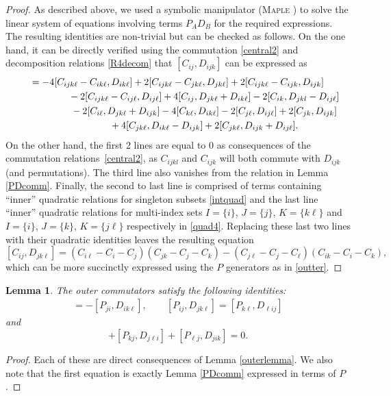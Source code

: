 \documentclass[10pt,a4paper]{amsart}
\numberwithin{equation}{section}
\newtheorem{Lemma}[Theorem]{Lemma}
\begin{document}
\begin{proof} As described above, we used a symbolic manipulator (\textsc{Maple} \cite{Maple}) to solve the linear system of equations involving terms $P_{A} D_B$ for the required expressions. The resulting identities are non-trivial but can be checked as follows. On the one hand, it can be directly verified using the commutation \eqref{central2} and decomposition relations \eqref{R4decom} that $[C_{ij}, D_{ijk}]$ can be expressed as
\begin{gather*}
[C_{ij},D_{jkl}]= - 4[C_{ijk\ell}-C_{ik\ell}, D_{ik\ell}]+2[C_{ijk\ell}-C_{jk\ell}, D_{jk\ell}]
+2[C_{ijk\ell}-C_{ijk}, D_{ijk}] \\
\hphantom{[C_{ij},D_{jkl}]=}{}- 2[C_{ijk\ell}-C_{ij\ell}, D_{ij\ell}]+4[C_{ij}, D_{jk\ell}+D_{ik\ell}]- 2[C_{ik},D_{jkl}-D_{ij\ell}]
\\
\hphantom{[C_{ij},D_{jkl}]=}{}- 2[C_{i\ell}, D_{jk\ell}+D_{ijk}]
-4 [C_{k\ell}, D_{ik\ell}]-2 [C_{j\ell}, D_{ij\ell}]
+2[C_{jk}, D_{ijk}]\\
\hphantom{[C_{ij},D_{jkl}]=}{}+4[C_{jk\ell}, D_{ik\ell}-D_{ijk}]+2[C_{jk\ell}, D_{ijk}+D_{ij\ell}].
\end{gather*}
 On the other hand, the first 2 lines are equal to 0 as consequences of the commutation relations~\eqref{central2}, as $C_{ijkl}$ and $C_{ijk}$ will both commute with $D_{ijk}$ (and permutations). The third line also vanishes from the relation in Lemma \ref{PDcomm}. Finally, the second to last line is comprised of terms containing ``inner'' quadratic relations for singleton subsets \eqref{intquad} and the last line ``inner'' quadratic relations for multi-index sets $I=\{i\}$, $J=\{j\}$, $K=\{k\ell\}$ and $I=\{i\}$, $J=\{k\}$, $ K=\{j\ell\}$ respectively in \eqref{quad4}. Replacing these last two lines with their quadratic identities leaves the resulting equation
 \[ [C_{ij}, D_{jk\ell}] =(C_{i\ell}- C_i -C_j) (C_{jk}-C_j-C_k)-(C_{j\ell}-C_j-C_{\ell})(C_{ik}-C_i-C_k),\]
which can be more succinctly expressed using the $P$ generators as in \eqref{outter}.
\end{proof}

\begin{Lemma} \label{allPDrel|}
The outer commutators satisfy the following identities:
\begin{gather*}
 [P_{ij}, D_{jk\ell}] =- [P_{ji} ,D_{ik\ell}],
\qquad
[P_{ij}, D_{jk\ell}]= [P_{k\ell}, D_{\ell ij}]
\end{gather*}
and
\begin{equation}
[P_{ij},D_{jk\ell}]+[P_{kj}, D_{j\ell i}]+[P_{\ell j}, D_{j ik}]=0. \label{switchPD}
\end{equation}
\end{Lemma}
\begin{proof}
 Each of these are direct consequences of Lemma \ref{outerlemma}. We also note that the first equation is exactly Lemma \ref{PDcomm} expressed in terms of $P$.
 \end{proof}
\end{document}
